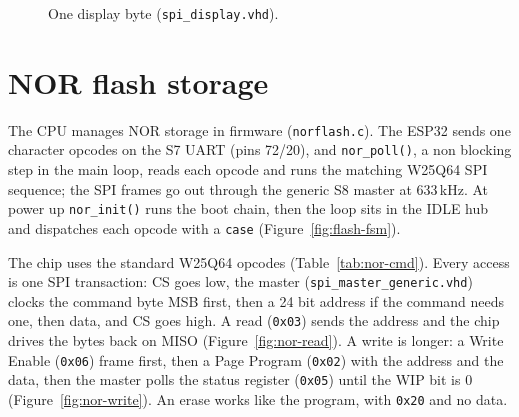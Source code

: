 \documentclass[a4paper,10pt]{article}
\newcommand{\clkspan}[4]{%
  \pgfmathtruncatemacro{\nn}{((#2)-(#1))/#4 - 1}%
  \foreach \i in {0,...,\nn}{%
    \draw[line width=0.4pt]
      ({#1+\i*#4},{#3-0.14})--({#1+\i*#4+0.5*#4},{#3-0.14})
      --({#1+\i*#4+0.5*#4},{#3+0.14})--({#1+(\i+1)*#4},{#3+0.14})--({#1+(\i+1)*#4},{#3-0.14});}}
\newcommand{\sgrid}[5]{%
  \foreach \i in {0,...,#2}{\draw[black!12, line width=0.3pt]
      ({#1+\i*#3},{#4}) -- ({#1+\i*#3},{#5});}}
\begin{document}
\begin{figure}[H]
\centering
{}
\caption{One display byte (\texttt{spi\_display.vhd}).}
\label{fig:disp-wave}
\end{figure}

\section{NOR flash storage}
\label{sec:flash}

The CPU manages NOR storage in firmware (\texttt{norflash.c}). The ESP32 sends one
character opcodes on the S7 UART (pins 72/20), and \texttt{nor\_poll()}, a non blocking
step in the main loop, reads each opcode and runs the matching W25Q64 SPI sequence; the
SPI frames go out through the generic S8 master at 633\,kHz. At power up
\texttt{nor\_init()} runs the boot chain, then the loop sits in the IDLE hub and
dispatches each opcode with a \texttt{case} (Figure~\ref{fig:flash-fsm}).

The chip uses the standard W25Q64 opcodes (Table~\ref{tab:nor-cmd}). Every access is one
SPI transaction: CS goes low, the master (\texttt{spi\_master\_generic.vhd}) clocks the
command byte MSB first, then a 24 bit address if the command needs one, then data, and CS
goes high. A read (\texttt{0x03}) sends the address and the chip drives the bytes back on
MISO (Figure~\ref{fig:nor-read}). A write is longer: a Write Enable (\texttt{0x06}) frame
first, then a Page Program (\texttt{0x02}) with the address and the data, then the master
polls the status register (\texttt{0x05}) until the WIP bit is 0
(Figure~\ref{fig:nor-write}). An erase works like the program, with \texttt{0x20} and no
data.
\end{document}
